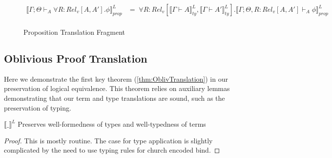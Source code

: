 \documentclass[acmsmall]{acmart}
\newcommand{\den}[1]{\llbracket #1\rrbracket}
\begin{document}
\begin{figure}[H]
\begin{align*}
    \den{\Gamma;\Theta\vdash_A \forall R:Rel_v[A,A'].\phi}^L_{prop} &=\;   \forall  R:Rel_v[\den{\Gamma \vdash A}^L_{ty},\den{\Gamma \vdash A'}^L_{ty}].\den{\Gamma;\Theta,R:Rel_v[A,A']\vdash_A \phi}^L_{prop}\\
    \end{align*}
    \caption{Proposition Translation Fragment}
    \label{fig:PropTranslation}
\end{figure}




  
\subsection{Oblivious Proof Translation}\label{sec:ProofTranslation}
Here we demonstrate the first key theorem (\cref{thm:OblivTranslation}) in our preservation of logical equivalence. This theorem relies on auxiliary lemmas demonstrating that our term and type translations are sound, such as the preservation of typing.

\begin{lemma} $\den{\_}^L$ Preserves well-formedness of types and well-typedness of terms
  \end{lemma}

\begin{proof}
  This is mostly routine. The case for type application is slightly complicated by the need to use typing rules for church encoded bind.
\end{proof}


  
\end{document}
